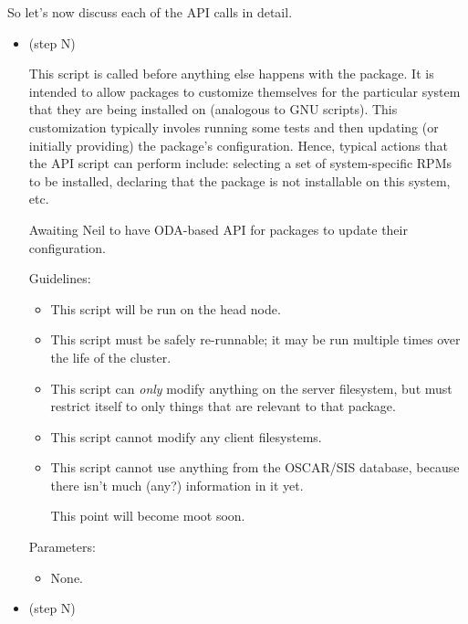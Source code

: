 So let's now discuss each of the API calls in detail.

\begin{itemize}

\begchange

\item {} (step N)
  
  This script is called before anything else happens with the package.
  It is intended to allow packages to customize themselves for the
  particular system that they are being installed on (analogous to GNU
   scripts).  This customization typically involes
  running some tests and then updating (or initially providing) the
  package's configuration.  Hence, typical actions that the
   API script can perform include: selecting a set of
  system-specific RPMs to be installed, declaring that the package is
  not installable on this system, etc.

  \begin{discuss}
    Awaiting Neil to have ODA-based API for packages to update their
    configuration.
  \end{discuss}

  Guidelines:

  \begin{itemize}
  \item This script will be run on the head node.
  \item This script must be safely re-runnable; it may be run multiple
    times over the life of the cluster.
  \item This script can {\em only} modify anything on the server
    filesystem, but must restrict itself to only things that are
    relevant to that package.
  \item This script cannot modify any client filesystems.
  \item This script cannot use anything from the OSCAR/SIS database,
    because there isn't much (any?) information in it yet.
    \begin{discuss}
      This point will become moot soon.
    \end{discuss}
  \end{itemize}

  Parameters:
  
  \begin{itemize}
  \item None.
  \end{itemize}

\item {} (step N)
  

\end{itemize}
